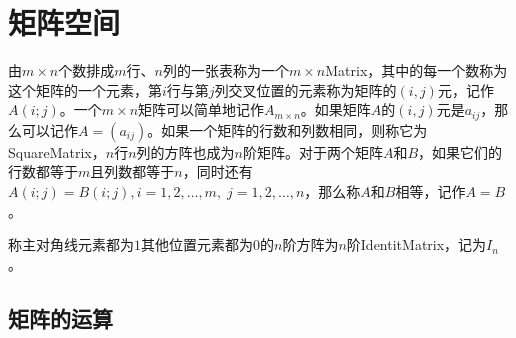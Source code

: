 \section{矩阵空间}

\begin{definition}
	由$m\times n$个数排成$m$行、$n$列的一张表称为一个$m\times n$\gls{Matrix}，其中的每一个数称为这个矩阵的一个元素，第$i$行与第$j$列交叉位置的元素称为矩阵的$(i,j)$元，记作$A(i;j)$。一个$m\times n$矩阵可以简单地记作$A_{m\times n}$。如果矩阵$A$的$(i,j)$元是$a_{ij}$，那么可以记作$A=(a_{ij})$。如果一个矩阵的行数和列数相同，则称它为\gls{SquareMatrix}，$n$行$n$列的方阵也成为$n$阶矩阵。对于两个矩阵$A$和$B$，如果它们的行数都等于$m$且列数都等于$n$，同时还有$A(i;j)=B(i;j),i=1,2,\dots,m,\;j=1,2,\dots,n$，那么称$A$和$B$相等，记作$A=B$。
\end{definition}
\begin{definition}
	称主对角线元素都为$1$其他位置元素都为$0$的$n$阶方阵为$n$阶\gls{IdentitMatrix}，记为$I_n$。
\end{definition}

\subsection{矩阵的运算}
